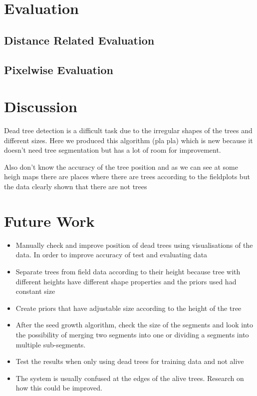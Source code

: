 \documentclass{subfiles}
\begin{document}
\newpage
\section{Evaluation} 

   \subsection{Distance Related Evaluation}


   \subsection{Pixelwise Evaluation}
		
		
\section{Discussion}

\par Dead tree detection is a difficult task due to the irregular shapes of the trees and different sizes. Here we produced this algorithm (pla pla) which is new because it doesn't need tree segmentation but has a lot of room for improvement. 

Also don't know the accuracy of the tree position and as we can see at some heigh maps there are places where there are trees according to the fieldplots but the data clearly shown that there are not trees
\section{Future Work}

\begin{itemize}
	\item Manually check and improve position of dead trees using visualisations of the data. In order to improve accuracy of test and evaluating data
	\item Separate trees from field data according to their height because tree with different heights have different shape properties and the priors used had constant size
	\item Create priors that have adjustable size according to the height of the tree	
	\item After the seed growth algorithm, check the size of the segments and look into the possibility of merging two segments into one or dividing a segments into multiple sub-segments.
	\item Test the results when only using dead trees for training data and not alive
	\item The system is usually confused at the edges of the alive trees. Research on how this could be improved. 
\end{itemize}
\end{document}

